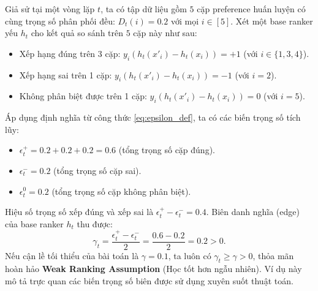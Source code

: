 \begin{example}
Giả sử tại một vòng lặp $t$, ta có tập dữ liệu gồm $5$ cặp preference huấn luyện có cùng trọng số phân phối đều: $D_t(i) = 0.2$ với mọi $i \in [5]$. Xét một base ranker yếu $h_t$ cho kết quả so sánh trên $5$ cặp này như sau:
\begin{itemize}
    \item Xếp hạng đúng trên 3 cặp: $y_i(h_t(x'_i) - h_t(x_i)) = +1$ (với $i \in \{1, 3, 4\}$).
    \item Xếp hạng sai trên 1 cặp: $y_i(h_t(x'_i) - h_t(x_i)) = -1$ (với $i = 2$).
    \item Không phân biệt được trên 1 cặp: $y_i(h_t(x'_i) - h_t(x_i)) = 0$ (với $i = 5$).
\end{itemize}
Áp dụng định nghĩa từ công thức \eqref{eq:epsilon_def}, ta có các biến trọng số tích lũy:
\begin{itemize}
    \item $\epsilon^+_t = 0.2 + 0.2 + 0.2 = 0.6$ (tổng trọng số cặp đúng).
    \item $\epsilon^-_t = 0.2$ (tổng trọng số cặp sai).
    \item $\epsilon^0_t = 0.2$ (tổng trọng số cặp không phân biệt).
\end{itemize}
Hiệu số trọng số xếp đúng và xếp sai là $\epsilon^+_t - \epsilon^-_t = 0.4$. Biên danh nghĩa (edge) của base ranker $h_t$ thu được:
\[
    \gamma_t = \frac{\epsilon^+_t - \epsilon^-_t}{2} = \frac{0.6 - 0.2}{2} = 0.2 > 0.
\]
Nếu cận lề tối thiểu của bài toán là $\gamma = 0.1$, ta luôn có $\gamma_t \ge \gamma > 0$, thỏa mãn hoàn hảo \textbf{Weak Ranking Assumption} (Học tốt hơn ngẫu nhiên). Ví dụ này mô tả trực quan các biến trọng số biên được sử dụng xuyên suốt thuật toán.
\end{example}

